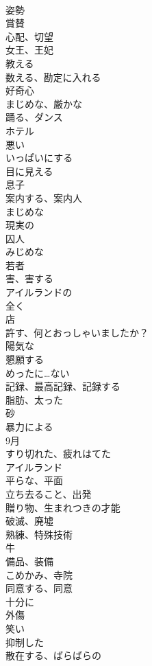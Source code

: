 \documentclass[8pt]{extreport}
\begin{document}
\begin{CJK}{UTF8}{min}
\\	姿勢
\\	賞賛
\\	心配、切望
\\	女王、王妃
\\	教える
\\	数える、勘定に入れる
\\	好奇心
\\	まじめな、厳かな
\\	踊る、ダンス
\\	ホテル
\\	悪い
\\	いっぱいにする
\\	目に見える
\\	息子
\\	案内する、案内人
\\	まじめな
\\	現実の
\\	囚人
\\	みじめな
\\	若者
\\	害、害する
\\	アイルランドの
\\	全く
\\	店
\\	許す、何とおっしゃいましたか？
\\	陽気な
\\	懇願する
\\	めったに…ない
\\	記録、最高記録、記録する
\\	脂肪、太った
\\	砂
\\	暴力による
\\	9月
\\	すり切れた、疲れはてた
\\	アイルランド
\\	平らな、平面
\\	立ち去ること、出発
\\	贈り物、生まれつきの才能
\\	破滅、廃墟
\\	熟練、特殊技術
\\	牛
\\	備品、装備
\\	こめかみ、寺院
\\	同意する、同意
\\	十分に
\\	外傷
\\	笑い
\\	抑制した
\\	散在する、ばらばらの

\end{CJK}
\end{document}
